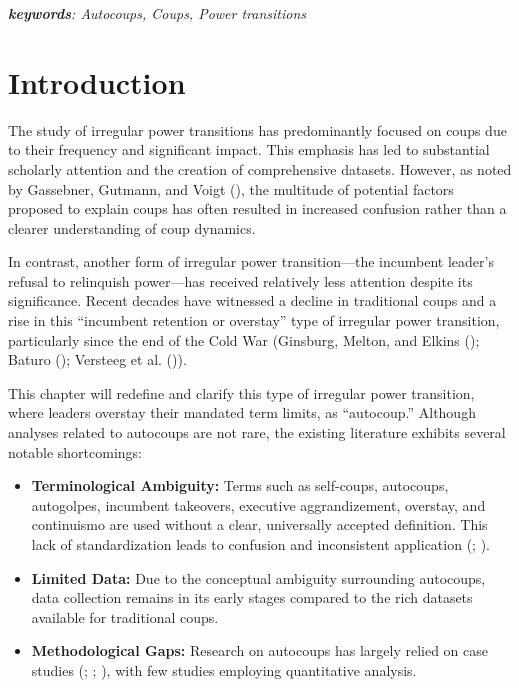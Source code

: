 \documentclass[
  12pt,
]{report}
\begin{document}
\emph{\textbf{keywords}: Autocoups, Coups, Power transitions}

\newpage

\section{Introduction}\label{introduction-2}

The study of irregular power transitions has predominantly focused on
coups due to their frequency and significant impact. This emphasis has
led to substantial scholarly attention and the creation of comprehensive
datasets. However, as noted by Gassebner, Gutmann, and Voigt
(), the multitude of potential factors
proposed to explain coups has often resulted in increased confusion
rather than a clearer understanding of coup dynamics.

In contrast, another form of irregular power transition---the incumbent
leader's refusal to relinquish power---has received relatively less
attention despite its significance. Recent decades have witnessed a
decline in traditional coups and a rise in this ``incumbent retention or
overstay'' type of irregular power transition, particularly since the
end of the Cold War (Ginsburg, Melton, and Elkins
(); Baturo
(); Versteeg et al.
()).

This chapter will redefine and clarify this type of irregular power
transition, where leaders overstay their mandated term limits, as
``autocoup.'' Although analyses related to autocoups are not rare, the
existing literature exhibits several notable shortcomings:

\begin{itemize}
\item
  \textbf{Terminological Ambiguity:} Terms such as self-coups,
  autocoups, autogolpes, incumbent takeovers, executive aggrandizement,
  overstay, and continuismo are used without a clear, universally
  accepted definition. This lack of standardization leads to confusion
  and inconsistent application
  (;
  ).
\item
  \textbf{Limited Data:} Due to the conceptual ambiguity surrounding
  autocoups, data collection remains in its early stages compared to the
  rich datasets available for traditional coups.
\item
  \textbf{Methodological Gaps:} Research on autocoups has largely relied
  on case studies (;
  ;
  ), with few studies employing quantitative analysis.
\end{itemize}
\end{document}

